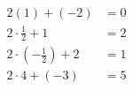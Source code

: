 \documentclass[preview]{standalone}
\begin{document}
\begin{align*}
2(1) + (-2) & = 0 \\ 2\cdot\frac{1}{2} + 1 & = 2 \\ 2\cdot(-\frac{1}{2}) + 2 & = 1 \\ 2\cdot4 + (-3)  & = 5
\end{align*}
\end{document}
